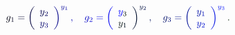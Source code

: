 \documentclass[12pt]{article}
\begin{document}
\makeatletter
\renewcommand*{\@textcolor}[3]{%
  \protect\leavevmode
  \begingroup
    \color#1{#2}#3%
  \endgroup
}
\makeatother
\begin{displaymath}
\mathcolor[RGB]{0,0,15}{g} _ { \mathcolor[RGB]{0,0,30}{1} } \mathcolor[RGB]{0,0,45}{=} \mathcolor[RGB]{0,0,60}{\left(} \begin{array} {l} { \mathcolor[RGB]{0,0,75}{y} _ { \mathcolor[RGB]{0,0,90}{2} } } \\ { \mathcolor[RGB]{0,0,105}{y} _ { \mathcolor[RGB]{0,0,120}{3} } } \end{array} \mathcolor[RGB]{0,0,135}{\right)} ^ { \mathcolor[RGB]{0,0,150}{y} _ { \mathcolor[RGB]{0,0,165}{1} } } \mathcolor[RGB]{0,0,180}{,} \quad \mathcolor[RGB]{0,0,195}{g} _ { \mathcolor[RGB]{0,0,210}{2} } \mathcolor[RGB]{0,0,225}{=} \mathcolor[RGB]{0,0,240}{\left(} \begin{array} {l} { \mathcolor[RGB]{0,0,255}{y} _ { \mathcolor[RGB]{0,15,0}{3} } } \\ { \mathcolor[RGB]{0,15,15}{y} _ { \mathcolor[RGB]{0,15,30}{1} } } \end{array} \mathcolor[RGB]{0,15,45}{\right)} ^ { \mathcolor[RGB]{0,15,60}{y} _ { \mathcolor[RGB]{0,15,75}{2} } } \mathcolor[RGB]{0,15,90}{,} \quad \mathcolor[RGB]{0,15,105}{g} _ { \mathcolor[RGB]{0,15,120}{3} } \mathcolor[RGB]{0,15,135}{=} \mathcolor[RGB]{0,15,150}{\left(} \begin{array} {l} { \mathcolor[RGB]{0,15,165}{y} _ { \mathcolor[RGB]{0,15,180}{1} } } \\ { \mathcolor[RGB]{0,15,195}{y} _ { \mathcolor[RGB]{0,15,210}{2} } } \end{array} \mathcolor[RGB]{0,15,225}{\right)} ^ { \mathcolor[RGB]{0,15,240}{y} _ { \mathcolor[RGB]{0,15,255}{3} } } \mathcolor[RGB]{0,30,0}{.}
\end{displaymath}
\end{document}
